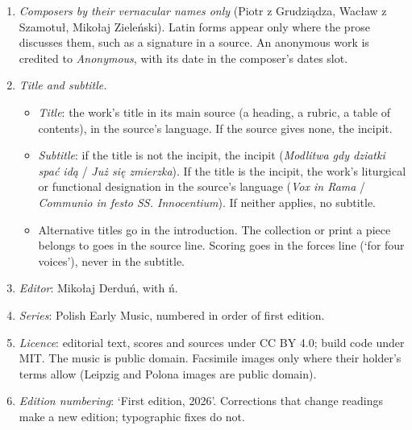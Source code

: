\begin{enumerate}

\tightlist
\item
  \textit{Composers by their vernacular names only} (Piotr z Grudziądza, Wacław z Szamotuł, Mikołaj Zieleński). Latin forms appear only where the prose discusses them, such as a signature in a source. An anonymous work is credited to \emph{Anonymous}, with its date in the composer's dates slot.
\item
  \textit{Title and subtitle.}

  \begin{itemize}
  \tightlist
  \item
    \emph{Title}: the work's title in its main source (a heading, a rubric, a table of contents), in the source's language. If the source gives none, the incipit.
  \item
    \emph{Subtitle}: if the title is not the incipit, the incipit (\emph{Modlitwa gdy dziatki spać idą} / \emph{Już się zmierzka}). If the title is the incipit, the work's liturgical or functional designation in the source's language (\emph{Vox in Rama} / \emph{Communio in festo SS. Innocentium}). If neither applies, no subtitle.
  \item
    Alternative titles go in the introduction. The collection or print a piece belongs to goes in the source line. Scoring goes in the forces line (‘for four voices’), never in the subtitle.
  \end{itemize}
\item
  \textit{Editor}: Mikołaj Derduń, with ń.
\item
  \textit{Series}: Polish Early Music, numbered in order of first edition.
\item
  \textit{Licence}: editorial text, scores and sources under CC BY 4.0; build code under MIT. The music is public domain. Facsimile images only where their holder's terms allow (Leipzig and Polona images are public domain).
\item
  \textit{Edition numbering}: ‘First edition, 2026’. Corrections that change readings make a new edition; typographic fixes do not.
\end{enumerate}
